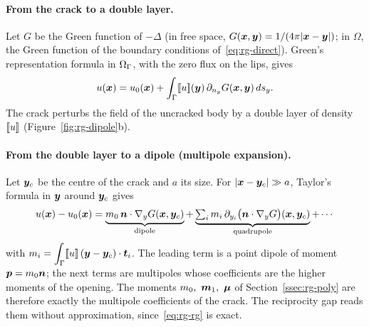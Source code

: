\paragraph{From the crack to a double layer.} Let $G$ be the Green function of $-\Delta$ (in free space, $G(\bm{x},\bm{y})=1/(4\pi|\bm{x}-\bm{y}|)$; in $\Omega$, the Green function of the boundary conditions of~\eqref{eq:rg-direct}). Green's representation formula in $\Omega_\Gamma$, with the zero flux on the lips, gives
\begin{equation}\label{eq:rg-dl}
u(\bm{x})=u_0(\bm{x})+\int_\Gamma[\![u]\!](\bm{y})\,\partial_{n_y}G(\bm{x},\bm{y})\,ds_y .
\end{equation}
The crack perturbs the field of the uncracked body by a double layer of density $[\![u]\!]$ (Figure~\ref{fig:rg-dipole}b).

\paragraph{From the double layer to a dipole (multipole expansion).} Let $\bm{y}_c$ be the centre of the crack and $a$ its size. For $|\bm{x}-\bm{y}_c|\gg a$, Taylor's formula in $\bm{y}$ around $\bm{y}_c$ gives
\begin{equation}\label{eq:rg-multipole}
u(\bm{x})-u_0(\bm{x})=\underbrace{m_0\,\bm{n}\cdot\nabla_yG(\bm{x},\bm{y}_c)}_{\text{dipole}}
+\underbrace{\textstyle\sum_i m_i\,\partial_{y_i}\bigl(\bm{n}\cdot\nabla_yG\bigr)(\bm{x},\bm{y}_c)}_{\text{quadrupole}}+\cdots
\end{equation}
with $\displaystyle m_i=\int_\Gamma[\![u]\!]\,(\bm{y}-\bm{y}_c)\cdot\bm{t}_i$. The leading term is a point dipole of moment $\bm{p}=m_0\bm{n}$; the next terms are multipoles whose coefficients are the higher moments of the opening. The moments $m_0,\ \bm{m}_1,\ \bm{\mu}$ of Section~\ref{ssec:rg-poly} are therefore exactly the multipole coefficients of the crack. The reciprocity gap reads them without approximation, since~\eqref{eq:rg-rg} is exact.

